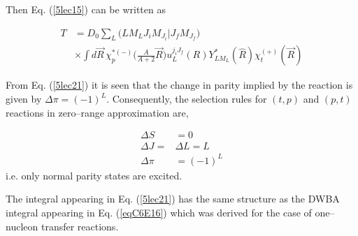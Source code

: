 \begin{subappendices}
Then Eq. (\ref{5lec15}) can be written as

\begin{equation}\label{5lec21}
\begin{split}
T&= D_0 \sum_L \bigl( L M_L J_i M_{J_i}|J_f M_{J_f} \bigr) \\
&\times \int d\vec R\, \chi^{*(-)}_p\bigl(\frac{A}{A+2}\vec R\bigr)
 u^{j_i J_f}_{L}(R) Y_{L M_L}^*(\hat R) \chi^{(+)}_t(\vec R)
\end{split}
\end{equation}


From Eq. (\ref{5lec21}) it is seen that the change in parity implied by the reaction is given by $\Delta\pi=(-1)^L$. Consequently, the selection rules for $(t,p)$ and  $(p,t)$ reactions in zero--range approximation are,


\begin{equation}\label{5lec22}
\begin{split}
\Delta S&=0\\
\Delta J=&\Delta L=L \\
\Delta\pi&=(-1)^L
\end{split}
\end{equation}
i.e. only normal parity states are excited.


The integral appearing in Eq. (\ref{5lec21}) has the same structure as the DWBA integral appearing in Eq. (\ref{eqC6E16}) which was derived for the case of one--nucleon transfer reactions.



\end{subappendices}
